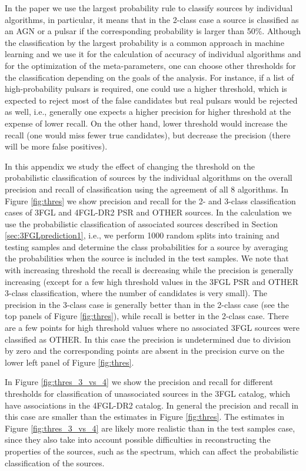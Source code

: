 In the paper we use the largest probability rule to classify sources by individual algorithms,
in particular, it means that in the 2-class case a source is classified as an AGN or a pulsar if the corresponding probability
is larger than 50\%.
Although the classification by the largest probability is a common approach in machine learning and we use it
for the calculation of accuracy of individual algorithms and for the optimization of the meta-parameters, 
one can choose other thresholds for the classification depending on the goals of the analysis.
For instance, if a list of high-probability pulsars is required, one could use a higher threshold, 
which is expected to reject most of the false candidates but real pulsars would be rejected as well, 
i.e., generally one expects a higher precision for higher threshold
at the expense of lower recall.
On the other hand, lower threshold would increase the recall (one would miss fewer true candidates), 
but decrease the precision (there will be more false positives).



In this appendix we study the effect of changing the threshold on the probabilistic classification of sources by the individual
algorithms on the overall precision and recall of classification using the agreement of all 8 algorithms.
In Figure \ref{fig:thres} we show precision and recall for the 2- and 3-class classification cases of 3FGL and 4FGL-DR2 PSR and OTHER sources.
In the calculation we use the probabilistic classification of associated sources described in Section \ref{sec:3FGLprediction1},
i.e., we perform 1000 random splits into training and testing samples and determine the class probabilities for a source by averaging the probabilities when the source is included in the test samples.
We note that with increasing threshold the recall is decreasing while the precision is generally increasing  (except for a few high threshold values in the 3FGL PSR and OTHER 3-class classification, where the number of candidates is very small).
The precision in the 3-class case is generally better than in the 2-class case (see the top panels of Figure \ref{fig:thres}),
while recall is better in the 2-class case.
There are a few points for high threshold values where no associated 3FGL sources were classified as OTHER.
In this case the precision is undetermined due to division by zero and the corresponding points are absent in the precision curve
on the lower left panel of Figure \ref{fig:thres}.


In Figure \ref{fig:thres_3_vs_4} we show the precision and recall for different thresholds for classification of unassociated sources in the 3FGL catalog, which have associations in the 4FGL-DR2 catalog. In general the precision and recall in this case are smaller than the estimates in Figure \ref{fig:thres}.  The estimates in Figure \ref{fig:thres_3_vs_4} are likely more realistic than in the test samples case, since they also take into account possible difficulties in reconstructing the properties of the sources, such as the spectrum, which can affect the probabilistic classification of the sources.




